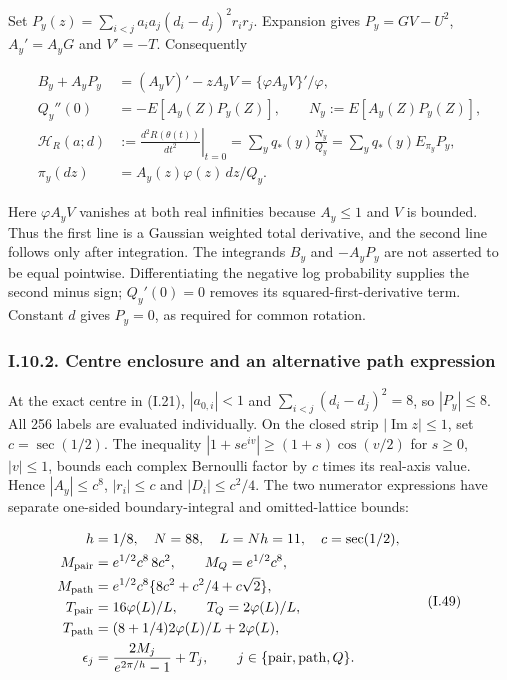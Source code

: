 \documentclass{article}
\begin{document}
Set \(P_y(z)=\sum_{i<j}a_ia_j(d_i-d_j)^2r_ir_j\). Expansion gives
\(P_y=GV-U^2\), \(A_y'=A_yG\) and \(V'=-T\). Consequently

\[
\begin{aligned}
B_y+A_yP_y&=(A_yV)'-zA_yV
=\{\varphi A_yV\}'/\varphi,\\
Q_y''(0)&=-E[A_y(Z)P_y(Z)],\qquad N_y:=E[A_y(Z)P_y(Z)],\\
\mathcal H_R(a;d)&:=\left.\frac{d^2R(\theta(t))}{dt^2}\right|_{t=0}
=\sum_yq_*(y)\frac{N_y}{Q_y}
=\sum_yq_*(y)E_{\pi_y}P_y,\\
\pi_y(dz)&=A_y(z)\varphi(z)\,dz/Q_y.
\end{aligned}
\tag{I.48}
\]

Here \(\varphi A_yV\) vanishes at both real infinities because
\(A_y\le1\) and \(V\) is bounded. Thus the first line is a Gaussian
weighted total derivative, and the second line follows only after
integration. The integrands \(B_y\) and \(-A_yP_y\) are not asserted to
be equal pointwise. Differentiating the negative log probability
supplies the second minus sign; \(Q_y'(0)=0\) removes its
squared-first-derivative term. Constant \(d\) gives \(P_y=0\), as
required for common rotation.

\subsubsection*{I.10.2. Centre enclosure and an alternative path
expression}\label{i.10.2.-centre-enclosure-and-an-alternative-path-expression}

At the exact centre in (I.21), \(|a_{0,i}|<1\) and
\(\sum_{i<j}(d_i-d_j)^2=8\), so \(|P_y|\le8\). All 256 labels are
evaluated individually. On the closed strip
\(|\operatorname{Im}z|\le1\), set \(c=\sec(1/2)\). The inequality
\(|1+s e^{iv}|\ge(1+s)\cos(v/2)\) for \(s\ge0\), \(|v|\le1\), bounds
each complex Bernoulli factor by \(c\) times its real-axis value. Hence
\(|A_y|\le c^8\), \(|r_i|\le c\) and \(|D_i|\le c^2/4\). The two
numerator expressions have separate one-sided boundary-integral and
omitted-lattice bounds:

\[
\begin{aligned}
h&=1/8,\quad N=88,\quad L=Nh=11,\quad c=\sec(1/2),\\
M_{\rm pair}&=e^{1/2}c^8\,8c^2,\qquad M_Q=e^{1/2}c^8,\\
M_{\rm path}&=e^{1/2}c^8\{8c^2+c^2/4+c\sqrt2\},\\
T_{\rm pair}&=16\varphi(L)/L,\qquad T_Q=2\varphi(L)/L,\\
T_{\rm path}&=(8+1/4)2\varphi(L)/L+2\varphi(L),\\
\epsilon_j&=\frac{2M_j}{e^{2\pi/h}-1}+T_j,\qquad j\in\{{\rm pair},{\rm path},Q\}.
\end{aligned}
\tag{I.49}
\]
\end{document}

